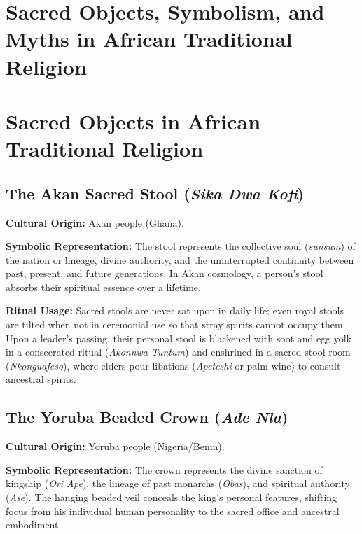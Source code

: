\documentclass[12pt,a4paper]{article}
\begin{document}
\section*{Sacred Objects, Symbolism, and Myths in African Traditional Religion}

\section{Sacred Objects in African Traditional Religion}

\subsection{The Akan Sacred Stool (\textit{Sika Dwa Kofi})}

\textbf{Cultural Origin:} Akan people (Ghana).

\textbf{Symbolic Representation:} The stool represents the collective soul (\textit{sunsum}) of the nation or lineage, divine authority, and the uninterrupted continuity between past, present, and future generations. In Akan cosmology, a person's stool absorbs their spiritual essence over a lifetime.

\textbf{Ritual Usage:} Sacred stools are never sat upon in daily life; even royal stools are tilted when not in ceremonial use so that stray spirits cannot occupy them. Upon a leader's passing, their personal stool is blackened with soot and egg yolk in a consecrated ritual (\textit{Akonnwa Tuntum}) and enshrined in a sacred stool room (\textit{Nkonguafeso}), where elders pour libations (\textit{Apeteshi} or palm wine) to consult ancestral spirits.

\subsection{The Yoruba Beaded Crown (\textit{Ade Nla})}

\textbf{Cultural Origin:} Yoruba people (Nigeria/Benin).

\textbf{Symbolic Representation:} The crown represents the divine sanction of kingship (\textit{Ori Ape}), the lineage of past monarchs (\textit{Obas}), and spiritual authority (\textit{Ase}). The hanging beaded veil conceals the king's personal features, shifting focus from his individual human personality to the sacred office and ancestral embodiment.
\end{document}
